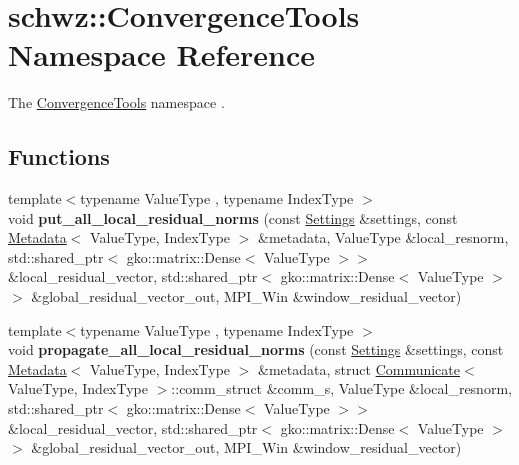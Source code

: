 \hypertarget{namespaceschwz_1_1ConvergenceTools}{}\section{schwz\+:\+:Convergence\+Tools Namespace Reference}
\label{namespaceschwz_1_1ConvergenceTools}


The \hyperlink{namespaceschwz_1_1ConvergenceTools}{Convergence\+Tools} namespace .  


\subsection*{Functions}
\begin{DoxyCompactItemize}
\item 
\mbox{\label{namespaceschwz_1_1ConvergenceTools_af5c55552b61e214f090b97cd712943be}} 
{\footnotesize template$<$typename Value\+Type , typename Index\+Type $>$ }\\void {\bfseries put\+\_\+all\+\_\+local\+\_\+residual\+\_\+norms} (const \hyperlink{structschwz_1_1Settings}{Settings} \&settings, const \hyperlink{structschwz_1_1Metadata}{Metadata}$<$ Value\+Type, Index\+Type $>$ \&metadata, Value\+Type \&local\+\_\+resnorm, std\+::shared\+\_\+ptr$<$ gko\+::matrix\+::\+Dense$<$ Value\+Type $>$$>$ \&local\+\_\+residual\+\_\+vector, std\+::shared\+\_\+ptr$<$ gko\+::matrix\+::\+Dense$<$ Value\+Type $>$$>$ \&global\+\_\+residual\+\_\+vector\+\_\+out, M\+P\+I\+\_\+\+Win \&window\+\_\+residual\+\_\+vector)
\item 
\mbox{\label{namespaceschwz_1_1ConvergenceTools_a305dc50bea8e54b5ec63c720d2a8e798}} 
{\footnotesize template$<$typename Value\+Type , typename Index\+Type $>$ }\\void {\bfseries propagate\+\_\+all\+\_\+local\+\_\+residual\+\_\+norms} (const \hyperlink{structschwz_1_1Settings}{Settings} \&settings, const \hyperlink{structschwz_1_1Metadata}{Metadata}$<$ Value\+Type, Index\+Type $>$ \&metadata, struct \hyperlink{classschwz_1_1Communicate}{Communicate}$<$ Value\+Type, Index\+Type $>$\+::comm\+\_\+struct \&comm\+\_\+s, Value\+Type \&local\+\_\+resnorm, std\+::shared\+\_\+ptr$<$ gko\+::matrix\+::\+Dense$<$ Value\+Type $>$$>$ \&local\+\_\+residual\+\_\+vector, std\+::shared\+\_\+ptr$<$ gko\+::matrix\+::\+Dense$<$ Value\+Type $>$$>$ \&global\+\_\+residual\+\_\+vector\+\_\+out, M\+P\+I\+\_\+\+Win \&window\+\_\+residual\+\_\+vector)

\end{DoxyCompactItemize}

